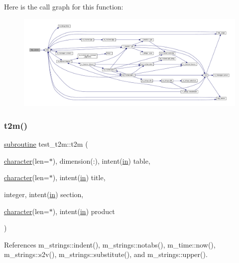 Here is the call graph for this function\+:
\nopagebreak
\begin{figure}[H]
\begin{center}
\leavevmode
\includegraphics[width=350pt]{t2m_8f90_a39c21619b08a3c22f19e2306efd7f766_cgraph}
\end{center}
\end{figure}
\mbox{\label{t2m_8f90_ab191ed2a41113781c7994c9642cfbbab}} 
\subsubsection{\texorpdfstring{t2m()}{t2m()}}
{\footnotesize\ttfamily \hyperlink{M__stopwatch_83_8txt_acfbcff50169d691ff02d4a123ed70482}{subroutine} test\+\_\+t2m\+::t2m (\begin{DoxyParamCaption}\item[{\hyperlink{option__stopwatch_83_8txt_abd4b21fbbd175834027b5224bfe97e66}{character}(len=$\ast$), dimension(\+:), intent(\hyperlink{M__journal_83_8txt_afce72651d1eed785a2132bee863b2f38}{in})}]{table,  }\item[{\hyperlink{option__stopwatch_83_8txt_abd4b21fbbd175834027b5224bfe97e66}{character}(len=$\ast$), intent(\hyperlink{M__journal_83_8txt_afce72651d1eed785a2132bee863b2f38}{in})}]{title,  }\item[{integer, intent(\hyperlink{M__journal_83_8txt_afce72651d1eed785a2132bee863b2f38}{in})}]{section,  }\item[{\hyperlink{option__stopwatch_83_8txt_abd4b21fbbd175834027b5224bfe97e66}{character}(len=$\ast$), intent(\hyperlink{M__journal_83_8txt_afce72651d1eed785a2132bee863b2f38}{in})}]{product }\end{DoxyParamCaption})}



References m\+\_\+strings\+::indent(), m\+\_\+strings\+::notabs(), m\+\_\+time\+::now(), m\+\_\+strings\+::s2v(), m\+\_\+strings\+::substitute(), and m\+\_\+strings\+::upper().

